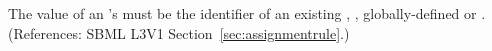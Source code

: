The value of an \AssignmentRule's  must be the identifier
of an existing \Compartment, \Species, globally-defined \Parameter or
\SpeciesReference.
(References: SBML L3V1 Section~\ref{sec:assignmentrule}.)
